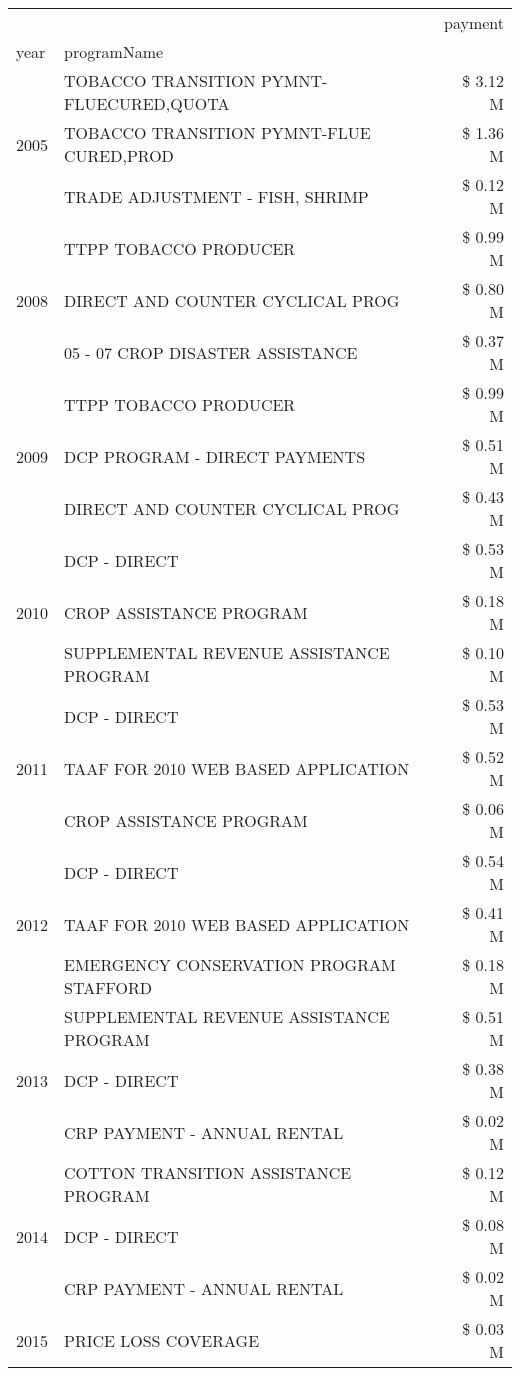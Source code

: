 \begin{tabular}{llr}
\toprule
 &  & payment \\
year & programName &  \\
\midrule
\multirow[t]{3}{*}{2005} & TOBACCO TRANSITION PYMNT-FLUECURED,QUOTA & \$ 3.12 M \\
 & TOBACCO TRANSITION PYMNT-FLUE CURED,PROD & \$ 1.36 M \\
 & TRADE ADJUSTMENT - FISH, SHRIMP & \$ 0.12 M \\
\cline{1-3}
\multirow[t]{3}{*}{2008} & TTPP TOBACCO PRODUCER & \$ 0.99 M \\
 & DIRECT AND COUNTER CYCLICAL PROG & \$ 0.80 M \\
 & 05 - 07 CROP DISASTER ASSISTANCE & \$ 0.37 M \\
\cline{1-3}
\multirow[t]{3}{*}{2009} & TTPP TOBACCO PRODUCER & \$ 0.99 M \\
 & DCP PROGRAM - DIRECT PAYMENTS & \$ 0.51 M \\
 & DIRECT AND COUNTER CYCLICAL PROG & \$ 0.43 M \\
\cline{1-3}
\multirow[t]{3}{*}{2010} & DCP - DIRECT & \$ 0.53 M \\
 & CROP ASSISTANCE PROGRAM & \$ 0.18 M \\
 & SUPPLEMENTAL REVENUE ASSISTANCE PROGRAM & \$ 0.10 M \\
\cline{1-3}
\multirow[t]{3}{*}{2011} & DCP - DIRECT & \$ 0.53 M \\
 & TAAF FOR 2010 WEB BASED APPLICATION & \$ 0.52 M \\
 & CROP ASSISTANCE PROGRAM & \$ 0.06 M \\
\cline{1-3}
\multirow[t]{3}{*}{2012} & DCP - DIRECT & \$ 0.54 M \\
 & TAAF FOR 2010 WEB BASED APPLICATION & \$ 0.41 M \\
 & EMERGENCY CONSERVATION PROGRAM STAFFORD & \$ 0.18 M \\
\cline{1-3}
\multirow[t]{3}{*}{2013} & SUPPLEMENTAL REVENUE ASSISTANCE PROGRAM & \$ 0.51 M \\
 & DCP - DIRECT & \$ 0.38 M \\
 & CRP PAYMENT - ANNUAL RENTAL & \$ 0.02 M \\
\cline{1-3}
\multirow[t]{3}{*}{2014} & COTTON TRANSITION ASSISTANCE PROGRAM & \$ 0.12 M \\
 & DCP - DIRECT & \$ 0.08 M \\
 & CRP PAYMENT - ANNUAL RENTAL & \$ 0.02 M \\
\cline{1-3}
\multirow[t]{3}{*}{2015} & PRICE LOSS COVERAGE & \$ 0.03 M \\

\end{tabular}
